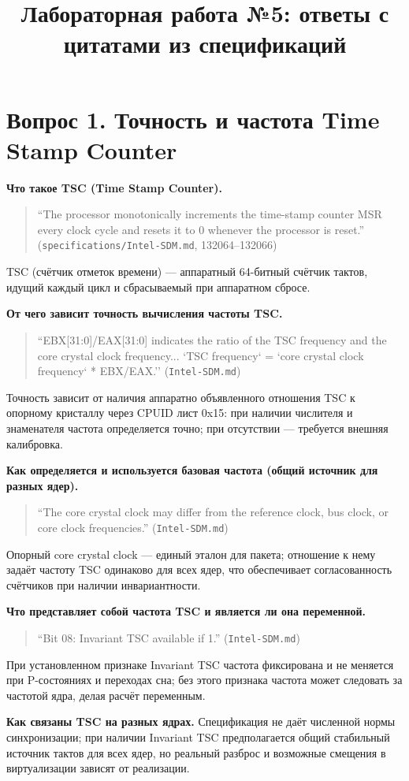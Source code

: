 \documentclass[a4paper,12pt]{article}
\title{Лабораторная работа №5: ответы с цитатами из спецификаций}
\author{}
\date{}
\begin{document}
\maketitle

\section*{Вопрос 1. Точность и частота Time Stamp Counter}
\textbf{Что такое TSC (Time Stamp Counter).} 
\begin{quote}
``The processor monotonically increments the time-stamp counter MSR every clock cycle and resets it to 0 whenever the processor is reset.'' (\texttt{specifications/Intel-SDM.md}, 132064--132066)
\end{quote}
TSC (счётчик отметок времени) — аппаратный 64-битный счётчик тактов, идущий каждый цикл и сбрасываемый при аппаратном сбросе.

\textbf{От чего зависит точность вычисления частоты TSC.} 
\begin{quote}
``EBX[31:0]/EAX[31:0] indicates the ratio of the TSC frequency and the core crystal clock frequency... `TSC frequency` = `core crystal clock frequency` * EBX/EAX.'' (\texttt{Intel-SDM.md})
\end{quote}
Точность зависит от наличия аппаратно объявленного отношения TSC к опорному кристаллу через CPUID лист 0x15: при наличии числителя и знаменателя частота определяется точно; при отсутствии — требуется внешняя калибровка.

\textbf{Как определяется и используется базовая частота (общий источник для разных ядер).} 
\begin{quote}
``The core crystal clock may differ from the reference clock, bus clock, or core clock frequencies.'' (\texttt{Intel-SDM.md})
\end{quote}
Опорный core crystal clock — единый эталон для пакета; отношение к нему задаёт частоту TSC одинаково для всех ядер, что обеспечивает согласованность счётчиков при наличии инвариантности.

\textbf{Что представляет собой частота TSC и является ли она переменной.} 
\begin{quote}
``Bit 08: Invariant TSC available if 1.'' (\texttt{Intel-SDM.md})
\end{quote}
При установленном признаке Invariant TSC частота фиксирована и не меняется при P-состояниях и переходах сна; без этого признака частота может следовать за частотой ядра, делая расчёт переменным.

\textbf{Как связаны TSC на разных ядрах.} Спецификация не даёт численной нормы синхронизации; при наличии Invariant TSC предполагается общий стабильный источник тактов для всех ядер, но реальный разброс и возможные смещения в виртуализации зависят от реализации.
\end{document}
